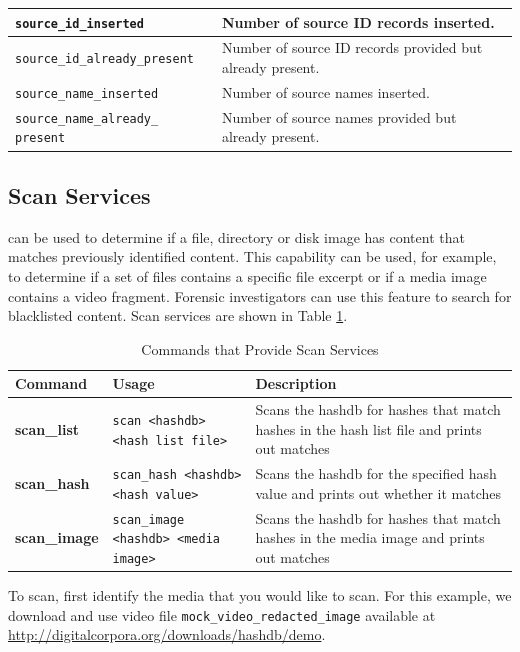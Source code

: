 \documentclass[11pt,fleqn]{article} %
\begin{document}
\begin{table}[!ht]
\begin{tabular}{|p{5 cm}|p{8.8 cm}|}
\verb+source_id_inserted+ &  Number of source ID records inserted.\\
\hline
\verb+source_id_already_present+ &  Number of source ID records provided but already present.\\
\hline

\verb+source_name_inserted+ &  Number of source names inserted.\\
\hline
\verb+source_name_already_+ \verb+present+ &  Number of source names provided but already present.\\
\hline
\end{tabular}
\end{table}

\subsection{Scan Services}
\label{ScanServices}
\hdb can be used to determine if a file, directory or disk image has content that matches previously identified content. This capability can be used, for example, to determine if a set of files contains a specific file excerpt or if a media image contains a video fragment. Forensic investigators can use this feature to search for blacklisted content.
Scan services are shown in Table \ref{tab:scanServices}. \\

\begin{table}[!ht]
\centering
\caption{Commands that Provide Scan Services}
\label{tab:scanServices}
\begin{tabular}{|p{3.5 cm}|p{6 cm}|p{4 cm}|}
\hline \hline
\textbf{Command} & \textbf{Usage} & \textbf{Description} \\
\hline
\textbf{scan\_list} & \verb+scan <hashdb>+ \verb+<hash list file>+ & Scans the hashdb for hashes that match hashes in the hash list file and prints out matches\\
\hline
\textbf{scan\_hash} & \verb+scan_hash <hashdb>+ \verb+<hash value>+ & Scans the hashdb for the specified hash value and prints out whether it matches\\
\hline
\textbf{scan\_image} & \verb+scan_image+ \verb+<hashdb> <media image>+ & Scans the hashdb for hashes that match hashes in the media image and prints out matches\\
\hline
\end{tabular}
\end{table}

To scan, first identify the media that you would like to scan. For this example, we download and use video file \texttt{mock\_video\_redacted\_image} available at \url{http://digitalcorpora.org/downloads/hashdb/demo}.\\
\end{document}
